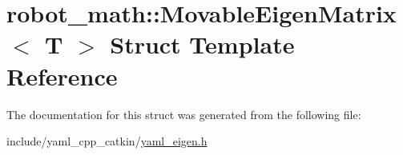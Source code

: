 \hypertarget{structrobot__math_1_1MovableEigenMatrix}{}\section{robot\+\_\+math\+:\+:Movable\+Eigen\+Matrix$<$ T $>$ Struct Template Reference}
\label{structrobot__math_1_1MovableEigenMatrix}


The documentation for this struct was generated from the following file\+:\begin{DoxyCompactItemize}
\item 
include/yaml\+\_\+cpp\+\_\+catkin/\hyperlink{yaml__eigen_8h}{yaml\+\_\+eigen.\+h}\end{DoxyCompactItemize}
